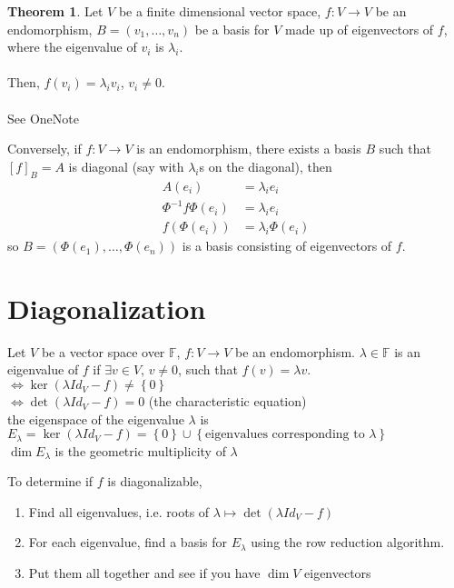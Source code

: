 \documentclass[letterpaper,12pt]{article}
\theoremstyle{definition}
\newtheorem*{theorem}{Theorem}
\newcommand{\set}[1]{\left\{ #1 \right\}}
\begin{document}
\begin{theorem}
Let $V$ be a finite dimensional vector space, $f: V \rightarrow V$ be an endomorphism, $B = (v_1, \dots, v_n)$ be a basis for $V$ made up of eigenvectors of $f$, where the eigenvalue of $v_i$ is $\lambda_i$.
\\ \\ Then, $f(v_i) = \lambda_i v_i$, $v_i \neq 0$.
\\ \\ See OneNote
\end{theorem}

Conversely, if $f: V \rightarrow V$ is an endomorphism, there exists a basis $B$ such that $[f]_B = A$ is diagonal (say with $\lambda_i$s on the diagonal), then
\begin{align*}
    A(e_i) & = \lambda_i e_i \\
    \Phi^{-1} f \Phi (e_i) & = \lambda_i e_i \\
    f(\Phi(e_i)) & = \lambda_i \Phi(e_i)
\end{align*}
so $B = (\Phi(e_1), \dots, \Phi(e_n))$ is a basis consisting of eigenvectors of $f$.

\section*{Diagonalization}
Let $V$ be a vector space over $\mathbb{F}$, $f: V \rightarrow V$ be an endomorphism. $\lambda \in \mathbb{F}$ is an eigenvalue of $f$ if $\exists v \in V$, $v \neq 0$, such that $f(v) = \lambda v$.
\\ $\iff \ker{(\lambda Id_{V} - f)} \neq \set{0}$
\\ $\iff \det{(\lambda Id_{V} - f)} = 0$ (the characteristic equation)
\\ the eigenspace of the eigenvalue $\lambda$ is $E_{\lambda} = \ker{(\lambda Id_{V} - f)} = \set{0} \cup \set{\text{eigenvalues corresponding to $\lambda$}}$
\\ $\dim{E_{\lambda}}$ is the geometric multiplicity of $\lambda$



To determine if $f$ is diagonalizable,
\begin{enumerate}
    \item Find all eigenvalues, i.e. roots of $\lambda \longmapsto \det{(\lambda Id_{V} - f)}$
    \item For each eigenvalue, find a basis for $E_{\lambda}$ using the row reduction algorithm.
    \item Put them all together and see if you have $\dim{V}$ eigenvectors
\end{enumerate}
\end{document}
